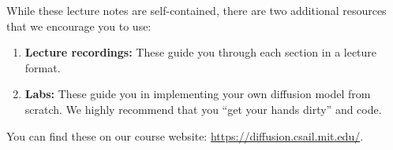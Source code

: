 \begin{remarkbox} 
While these lecture notes are self-contained, there are two additional resources that we encourage you to use:
\begin{enumerate}
    \item \textbf{Lecture recordings:} These guide you through each section in a lecture format.
    \item \textbf{Labs:} These guide you in implementing your own diffusion model from scratch. We highly recommend that you ``get your hands dirty'' and code.
\end{enumerate}
You can find these on our course website: \url{https://diffusion.csail.mit.edu/}.
\end{remarkbox}



